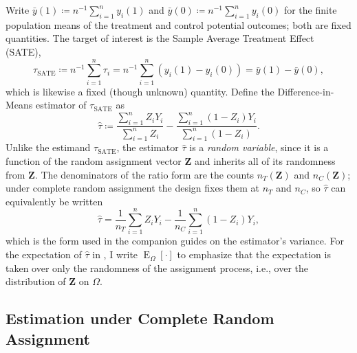 \documentclass[12pt,leqno]{article}
\theoremstyle{newstyle}
\DeclareMathOperator{\E}{\mathrm{E}}
\DeclareMathOperator{\Var}{\mathrm{Var}}
\newcommand{\bZ}{\bm{Z}}   \newcommand{\bz}{\bm{z}}   %
\newcommand{\EZ}{\E_{\Omega}}    \newcommand{\VarZ}{\Var_{\Omega}}  %
\newcommand{\po}[2]{y_{#1}(#2)}     %
\newcommand{\ybar}[1]{\bar{y}(#1)}  %
\newcommand{\tauS}{\tau_{\text{SATE}}}
\newcommand{\tauhat}{\hat{\tau}}
\newcommand{\ind}[1]{\mathbbm{1}\left[#1\right]}
\begin{document}
Write $\ybar{1} \coloneqq n^{-1} \sum_{i = 1}^n \po{i}{1}$ and $\ybar{0} \coloneqq n^{-1} \sum_{i = 1}^n \po{i}{0}$ for the finite population means of the treatment and control potential outcomes; both are fixed quantities. The target of interest is the Sample Average Treatment Effect (SATE),
\begin{equation*}
\tauS \coloneqq n^{-1} \sum \limits_{i = 1}^n \tau_i = n^{-1} \sum \limits_{i = 1}^n \left(\po{i}{1} - \po{i}{0}\right) = \ybar{1} - \ybar{0},
\end{equation*}
which is likewise a fixed (though unknown) quantity. Define the Difference-in-Means estimator of $\tauS$ as
\begin{equation}
\label{eq: diff means est I SATE}
\tauhat \coloneqq \dfrac{\sum \limits_{i = 1}^n Z_i Y_i}{\sum\limits_{i = 1}^n Z_i}  - \dfrac{\sum \limits_{i = 1}^n \left(1 - Z_i\right) Y_i}{\sum\limits_{i = 1}^n \left(1 - Z_i\right)}.
\end{equation}
Unlike the estimand $\tauS$, the estimator $\tauhat$ is a \textit{random variable}, since it is a function of the random assignment vector $\bZ$ and inherits all of its randomness from $\bZ$. The denominators of the ratio form are the counts $n_T(\bZ)$ and $n_C(\bZ)$; under complete random assignment the design fixes them at $n_T$ and $n_C$, so $\tauhat$ can equivalently be written
\begin{equation*}
\tauhat = \dfrac{1}{n_T} \sum \limits_{i = 1}^n Z_i Y_i - \dfrac{1}{n_C} \sum \limits_{i = 1}^n \left(1 - Z_i\right) Y_i,
\end{equation*}
which is the form used in the companion guides on the estimator's variance. For the expectation of $\tauhat$ in , I write $\EZ[\cdot]$ to emphasize that the expectation is taken over only the randomness of the assignment process, i.e., over the distribution of $\bZ$ on $\Omega$.

\subsection{Estimation under Complete Random Assignment}

\end{document}
